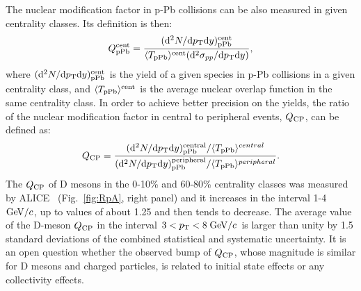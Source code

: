 The nuclear modification factor in p-Pb collisions can be also measured in given centrality classes.
Its definition is then:
\begin{equation}
Q_{\rm pPb}^{\rm cent} = \frac{({\rm d}^2 N/{\rm d} p_{\rm T} {\rm d} y)^{\rm cent}_{\rm pPb}}{\langle T_{\rm pPb} \rangle ^{\rm cent}({\rm d}^2 \sigma_{pp}/{\rm d} p_{\rm T} {\rm d} y)},
\end{equation}
where $({\rm d}^2 N/{\rm d} p_{\rm T} {\rm d} y)^{\rm cent}_{\rm pPb}$ is the yield of a given species in p-Pb collisions 
in a given centrality class, and $\langle T_{\rm pPb} \rangle ^{\rm cent}$ is the average nuclear 
overlap function in the same centrality class.
In order to achieve better precision on the yields, the ratio of the nuclear 
modification factor in central to peripheral events, $Q_{\rm CP}$, 
can be defined as:
\begin{equation}
Q_{\rm CP} = \frac{({\rm d}^2 N/{\rm d} p_{\rm T} {\rm d} y)^{\rm central}_{\rm pPb}/ \langle T_{\rm pPb} \rangle^{central}}{({\rm d}^2 N/{\rm d} p_{\rm T} {\rm d} y)^{\rm peripheral}_{\rm pPb}/ \langle T_{\rm pPb} \rangle^{peripheral}}.
\label{eq:QCP}
\end{equation}
The $Q_{\rm CP}$ of D mesons in the 0-10\% and 60-80\% centrality classes was measured by 
ALICE~\cite{ALICEPAS2017008} (Fig.~\ref{fig:RpA}, right panel) and it increases in the interval 1-4 $\mathrm{GeV}/c$, 
up to values of about 1.25 and then tends to decrease. The average value of the D-meson $Q_{\rm CP}$ 
in the interval $3 < p_{\rm T} < 8 \; \mathrm{GeV}/c$ is larger than unity by 1.5 standard deviations of the combined statistical and systematic uncertainty.
It is an open question whether the observed bump of $Q_{\rm CP}$, whose magnitude is similar 
for D mesons and charged particles, is related to initial state effects or any collectivity effects.

